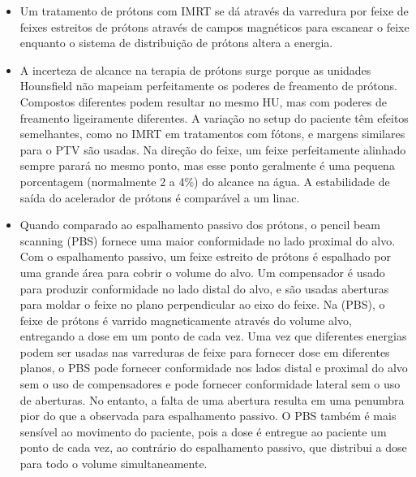 \documentclass[11pt,a4paper]{article}
\newcounter{exemplo}
\begin{document}
\begin{exemplo}
\begin{itemize}
        \item Um tratamento de prótons com IMRT se dá através da varredura por feixe de feixes estreitos de prótons através de campos magnéticos para escanear o feixe enquanto o sistema de distribuição de prótons altera a energia.
        
        \item A incerteza de alcance na terapia de prótons surge porque as unidades Hounsfield não mapeiam perfeitamente os poderes de freamento de prótons. Compostos diferentes podem resultar no mesmo HU, mas com poderes de freamento ligeiramente diferentes. A variação no setup do paciente têm efeitos semelhantes, como no IMRT em tratamentos com fótons, e margens similares para o PTV  são usadas. Na direção do feixe, um feixe perfeitamente alinhado sempre parará no mesmo ponto, mas esse ponto geralmente é uma pequena porcentagem (normalmente 2 a 4\%) do alcance na água. A estabilidade de saída do acelerador de prótons é comparável a um linac.
        
        \item Quando comparado ao espalhamento passivo dos prótons, o pencil beam scanning (PBS) fornece uma maior conformidade no lado proximal do alvo. Com o espalhamento passivo, um feixe estreito de prótons é espalhado por uma grande área para cobrir o volume do alvo. Um compensador é usado para produzir conformidade no lado distal do alvo, e  são usadas aberturas para moldar o feixe no plano perpendicular ao eixo do feixe. Na (PBS), o feixe de prótons é varrido magneticamente através do volume alvo, entregando a dose em um ponto de cada vez. Uma vez que diferentes energias podem ser usadas nas varreduras de feixe para fornecer dose em diferentes planos, o PBS pode fornecer conformidade nos lados distal e proximal do alvo sem o uso de compensadores e pode fornecer conformidade lateral sem o uso de aberturas. No entanto, a falta de uma abertura resulta em uma penumbra pior do que a observada para espalhamento passivo. O PBS também é mais sensível ao movimento do paciente, pois a dose é entregue ao paciente um ponto de cada vez, ao contrário do espalhamento passivo, que distribui a dose para todo o volume simultaneamente.
    \end{itemize}
\end{exemplo}


    
\end{document}
